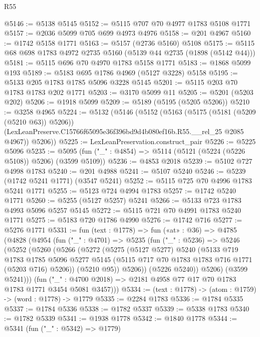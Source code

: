 \begin{lexlean}{R55}
\begin{coremodule}
@5146 := @5138 @5145
@5152 := @5115 @707 @70 @4977 @1783 @5108 @1771
@5157 := @2036 @5099 @705 @699 @4973 @4976
@5158 := @201 @4967
@5160 := @1742 @5158 @1771
@5163 := @5157 (@2736 @5160) @5108
@5175 := @5115 @68 @698 @1783 @4972 @2735 @5160 (@5139 @44 @2735 (@1898 (@5142 @44)))
@5181 := @5115 @696 @70 @4970 @1783 @5158 @1771
@5183 := @1868 @5099 @193
@5189 := @5183 @695 @1786 @4969 (@5127 @3228) @5158
@5195 := @5133 @205 @1783 @1785 @5096 @3228 @5145
@5201 := @5115 @203 @70 @1783 @1783 @202 @1771
@5203 := @3170 @5099 @11
@5205 := @5201 (@5203 @202)
@5206 := @1918 @5099
@5209 := @5189 (@5195 (@5205 @5206))
@5210 := @3258 @4965
@5224 := @5132
    (@5146
      (@5152
        (@5163
          (@5175 (@5181 (@5209 (@5210 @63)) @5206))
          (LexLeanPreserve.C15766f65095e36f396bd9d4b080ef16b.R55.__rel_25 @2085 @4967))
        @5206))
@5225 := LexLeanPreservation.construct_pair
@5226 := @5225 @5096
@5235 := @5095 (fun ("_" : @4854) => @5114 (@5121 (@5224 (@5226 @5108)) @5206) (@3599 @5109))
@5236 := @4853 @2018
@5239 := @5102 @727 @4998 @1783
@5240 := @201 @4988
@5241 := @5107 @5240
@5246 := @5239 (@1742 @5241 @1771) (@3547 @5241)
@5252 := @5115 @725 @70 @4996 @1783 @5241 @1771
@5255 := @5123 @724 @4994 @1783
@5257 := @1742 @5240 @1771
@5260 := @5255 (@5127 @5257) @5241
@5266 := @5133 @723 @1783 @4993 @5096 @5257 @5145
@5272 := @5115 @721 @70 @4991 @1783 @5240 @1771
@5275 := @5183 @720 @1786 @4990
@5276 := @1742 @716
@5277 := @5276 @1771
@5331 := fun (text : @1778) =>
  fun («at» : @36) =>
  @4785
    (@4828
      (@4954
        (fun ("_" : @4701) =>
        @5235
          (fun ("_" : @5236) =>
          @5246
            (@5252
              (@5260
                (@5266
                  (@5272
                    (@5275
                      (@5127 @5277)
                      @5240
                      (@5133
                        @719
                        @1783
                        @1785
                        @5096
                        @5277
                        @5145
                        (@5115 @717 @70 @1783 @1783 @716 @1771 (@5203 @716) @5206))
                      (@5210 @95))
                    @5206))
                (@5226 @5240))
              @5206)
            (@3599 @5241)))
        (fun ("_" : @4700 @2018) => @2181 @4958 @77 @17 @70 @1783 @1783 @1771 @3454 @5081 @3457)))
@5334 := (text : @1778) -> (atom : @1759) -> (word : @1778) -> @1779
@5335 := @2284 @1783
@5336 := @1784 @5335
@5337 := @1784 @5336
@5338 := @1782 @5337
@5339 := @5338 @1783
@5340 := @1782 @5339
@5341 := @1938 @1778
@5342 := @1840 @1778
@5344 := @5341 (fun ("_" : @5342) => @1779)

\end{coremodule}
\end{lexlean}

